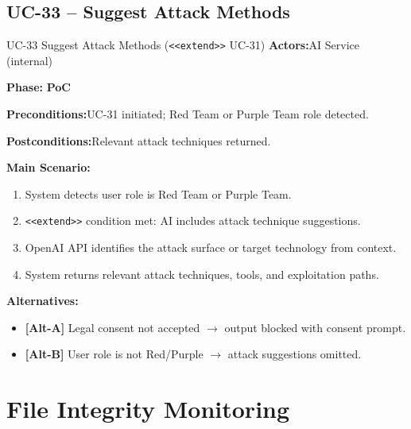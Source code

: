 \documentclass[12pt,a4paper]{report}
\newcommand{\ucfield}[2]{%
    \noindent\textbf{\color{helixpurplemid}#1:}\quad #2\par\medskip
}
\newcommand{\ucphase}[1]{%
    \noindent\textbf{\color{helixpurplemid}Phase:}\quad%
    \ifstrequal{#1}{PoC}{\textcolor{helixteal}{\textbf{PoC}}}{\textcolor{helixamber}{\textbf{Future MVP}}}%
    \par\medskip
}
\begin{document}
\section{UC-33 -- Suggest Attack Methods}
\begin{ucbox}{UC-33 \quad Suggest Attack Methods \textnormal{(\texttt{<<extend>>} UC-31)}}
    \ucfield{Actors}{AI Service (internal)}
    \ucphase{PoC}
    \ucfield{Preconditions}{UC-31 initiated; Red Team or Purple Team role detected.}
    \ucfield{Postconditions}{Relevant attack techniques returned.}
    \textbf{\color{helixpurplemid}Main Scenario:}
    \begin{enumerate}
        \item System detects user role is Red Team or Purple Team.
        \item \texttt{<<extend>>} condition met: AI includes attack technique suggestions.
        \item OpenAI API identifies the attack surface or target technology from context.
        \item System returns relevant attack techniques, tools, and exploitation paths.
    \end{enumerate}
    \textbf{\color{helixpurplemid}Alternatives:}
    \begin{itemize}
        \item \textbf{[Alt-A]} Legal consent not accepted $\rightarrow$ output blocked with consent prompt.
        \item \textbf{[Alt-B]} User role is not Red/Purple $\rightarrow$ attack suggestions omitted.
    \end{itemize}
\end{ucbox}

\chapter{File Integrity Monitoring}
\end{document}
